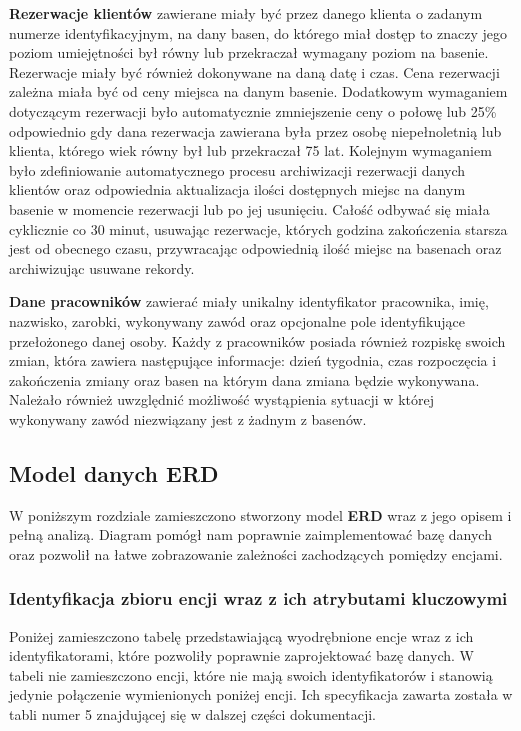 \documentclass[a4paper]{article}
\begin{document}
\clearpage

\textbf{Rezerwacje klientów} zawierane miały być przez danego klienta o zadanym numerze identyfikacyjnym, na dany basen, do którego miał dostęp to znaczy jego poziom umiejętności był równy lub przekraczał wymagany poziom na basenie. Rezerwacje miały być również dokonywane na daną datę i czas. Cena rezerwacji zależna miała być od ceny miejsca na danym basenie. Dodatkowym wymaganiem dotyczącym rezerwacji było automatycznie zmniejszenie ceny o połowę lub 25\% odpowiednio gdy dana rezerwacja zawierana była przez osobę niepełnoletnią lub klienta, którego wiek równy był lub przekraczał 75 lat. Kolejnym wymaganiem było zdefiniowanie automatycznego procesu archiwizacji rezerwacji danych klientów oraz odpowiednia aktualizacja ilości dostępnych miejsc na danym basenie w momencie rezerwacji lub po jej usunięciu. Całość odbywać się miała cyklicznie co 30 minut, usuwając rezerwacje, których godzina zakończenia starsza jest od obecnego czasu, przywracając odpowiednią ilość miejsc na basenach oraz archiwizując usuwane rekordy.

\textbf{Dane pracowników} zawierać miały unikalny identyfikator pracownika, imię, nazwisko, zarobki, wykonywany zawód oraz opcjonalne pole identyfikujące przełożonego danej osoby. Każdy z pracowników posiada również rozpiskę swoich zmian, która zawiera następujące informacje: dzień tygodnia, czas rozpoczęcia i zakończenia zmiany oraz basen na którym dana zmiana będzie wykonywana. Należało również uwzględnić możliwość wystąpienia sytuacji w której wykonywany zawód niezwiązany jest z żadnym z basenów.

\subsection{Model danych \textbf{ERD}}

W poniższym rozdziale zamieszczono stworzony model \textbf{ERD} wraz z jego opisem i pełną analizą. Diagram pomógł nam poprawnie zaimplementować bazę danych oraz pozwolił na łatwe zobrazowanie zależności zachodzących pomiędzy encjami.

\subsubsection{Identyfikacja zbioru encji wraz z ich atrybutami kluczowymi}

Poniżej zamieszczono tabelę przedstawiającą wyodrębnione encje wraz z ich identyfikatorami, które pozwoliły poprawnie zaprojektować bazę danych. W tabeli nie zamieszczono encji, które nie mają swoich identyfikatorów i stanowią jedynie połączenie wymienionych poniżej encji. Ich specyfikacja zawarta została w tabli numer 5 znajdującej się w dalszej części dokumentacji.
\end{document}
